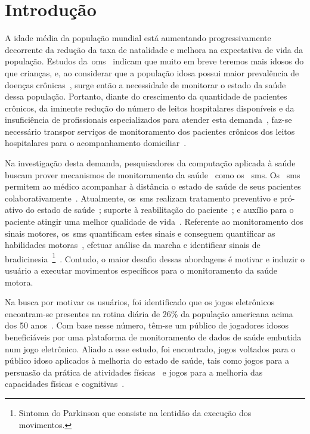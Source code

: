 \chapter{Introdu\c{c}\~{a}o} \label{chapter:intro}

A idade média da população mundial está aumentando progressivamente decorrente da redução da taxa de natalidade e melhora na expectativa de vida da população. Estudos da~\ac{oms}~\cite{ageing2011} indicam que muito em breve teremos mais idosos do que crianças, e, ao considerar que a população idosa possui maior prevalência de doenças crônicas~\cite{prevcronica2009}, surge então a necessidade de monitorar o estado da saúde dessa população. Portanto, diante do crescimento da quantidade de pacientes crônicos, da iminente redução do número de leitos hospitalares disponíveis e da insuficiência de profissionais especializados para atender esta demanda~\cite{healthmonitoring2013}, faz-se necessário transpor serviços de monitoramento dos pacientes crônicos dos leitos hospitalares para o acompanhamento domiciliar~\cite{homecarebrazil2011}. 

Na investigação desta demanda, pesquisadores da computação aplicada à saúde buscam prover mecanismos de monitoramento da saúde~\cite{healthmonitoring2013,bardram2010,aarhus_negotiating_2010} como os ~\ac{sms}. Os ~\ac{sms} permitem ao médico acompanhar à distância o estado de saúde de seus pacientes colaborativamente~\cite{healthmonitoring2013}. Atualmente, os~\ac{sms} realizam tratamento preventivo e pró-ativo do estado de saúde~\cite{bardram2010}; suporte à reabilitação do paciente~\cite{sacbespoke2014}; e auxílio para o paciente atingir uma melhor qualidade de vida~\cite{sacsvmhms2014}. Referente ao monitoramento dos sinais motores, os~\ac{sms} quantificam estes sinais e conseguem quantificar as habilidades motoras~\cite{manumeterjbhi2014,patel_monitoring_2009}, efetuar análise da marcha \cite{robotgait2014} e identificar sinais de bradicinesia~\footnote{Sintoma do Parkinson que consiste na lentidão da execução dos movimentos.}~\cite{ambulatoryparkinson2010}. Contudo, o maior desafio dessas abordagens é motivar e induzir o usuário a executar movimentos específicos para o monitoramento da saúde motora.

Na busca por motivar os usuários, foi identificado que os jogos eletrônicos encontram-se presentes na rotina diária de 26\% da população americana acima dos 50 anos~\cite{esa2016}. Com base nesse número, têm-se um público de jogadores idosos beneficiáveis por uma plataforma de monitoramento de dados de saúde embutida num jogo eletrônico. Aliado a esse estudo, foi encontrado, jogos voltados para o público idoso aplicados à melhoria do estado de saúde, tais como jogos para a persuasão da prática de atividades físicas~\cite{brox11} e jogos para a melhoria das capacidades físicas e cognitivas~\cite{arntzen2011}. 

